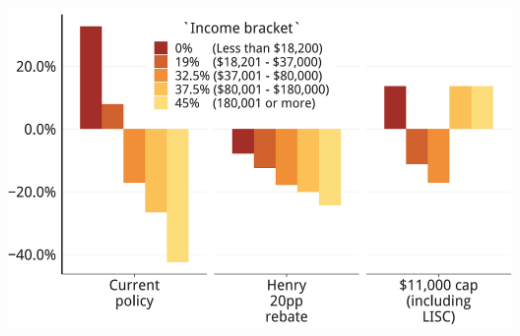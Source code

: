 \documentclass[tikz]{standalone}\usepackage[]{graphicx}\usepackage[]{color}
\newenvironment{knitrout}{}{} %
\begin{document}
\begin{knitrout}
\color{fgcolor}
\includegraphics[width=11.000in,height=7.00in]{./Super-tax-targeting/b5-super-atlas/Figure4-9-1} 

\end{knitrout}
\end{document}

